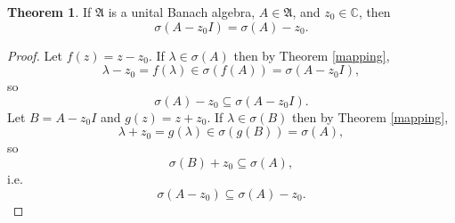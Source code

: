 \documentclass{article}
\theoremstyle{definition}
\newtheorem{theorem}{Theorem}
\theoremstyle{definition}
\begin{document}
\begin{theorem}
 If $\mathfrak{A}$ is a unital Banach algebra, $A \in \mathfrak{A}$, and $z_0 \in \mathbb{C}$, then
 \[
 \sigma(A-z_0I) = \sigma(A)-z_0.
 \]
 \label{translation}
 \end{theorem}
 \begin{proof}
Let $f(z)=z-z_0$. If $\lambda \in \sigma(A)$ then by Theorem \ref{mapping},
\[
\lambda - z_0=f(\lambda) \in \sigma(f(A))= \sigma(A-z_0 I),
\]
so
\[
\sigma(A)-z_0 \subseteq \sigma(A-z_0 I).
\]
Let $B=A-z_0 I$ and $g(z)=z+z_0$.
If $\lambda \in \sigma(B)$ then by Theorem \ref{mapping},
\[
\lambda + z_0=g(\lambda) \in \sigma(g(B)) = \sigma(A),
\]
so
\[
\sigma(B)+z_0 \subseteq \sigma(A),
\]
i.e.
\[
\sigma(A-z_0) \subseteq \sigma(A)-z_0.
\]
 \end{proof} 
\end{document}
